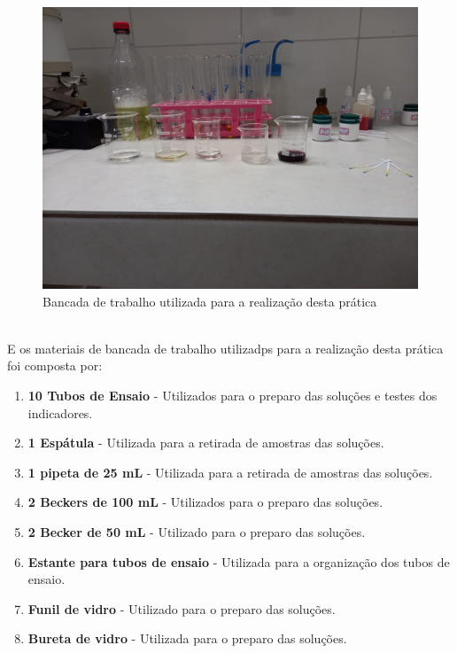     \begin{figure}[h]
        \centering
        \includegraphics[scale=0.25]{pictures/bancada.jpeg}
        \caption{Bancada de trabalho utilizada para a realização desta prática}\label{fig:figure1}
    \end{figure}\\

    \indent E os materiais de bancada de trabalho utilizadps para a realização desta prática foi composta por:
    \begin{enumerate}
        \item \textbf{10 Tubos de Ensaio} - Utilizados para o preparo das soluções e testes dos indicadores.
        \item \textbf{1 Espátula} - Utilizada para a retirada de amostras das soluções.
        \item \textbf{1 pipeta de 25 mL} - Utilizada para a retirada de amostras das soluções.
        \item \textbf{2 Beckers de 100 mL} - Utilizados para o preparo das soluções.
        \item \textbf{2 Becker de 50 mL} - Utilizado para o preparo das soluções.
        \item \textbf{Estante para tubos de ensaio} - Utilizada para a organização dos tubos de ensaio.
        \item \textbf{Funil de vidro} - Utilizado para o preparo das soluções.
        \item \textbf{Bureta de vidro} - Utilizada para o preparo das soluções.
    \end{enumerate}

